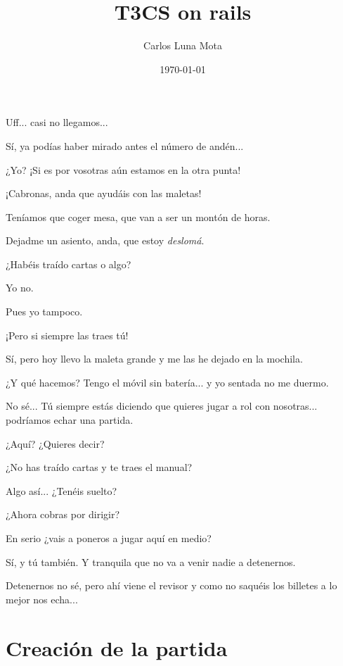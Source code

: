\documentclass[10pt, a5paper, twocolumn]{article}
\title{T3CS on rails}
\author{Carlos Luna Mota}
\date{\today}
\newenvironment{dialogue}
    {\begin{description}[leftmargin=!,align=right,labelwidth=0.cm]}
    {\end{description}}
\newcommand\A{\item[\raisebox{-0.25em}{\scalebox{0.75}{\bctetraedre}}]}
\newcommand\B{\item[\raisebox{-0.25em}{\scalebox{0.75}{\bccube}}]}
\newcommand\E{\item[\raisebox{-0.25em}{\scalebox{0.75}{\bcicosaedre}}]}
\begin{document}
    \maketitle %

    \begin{dialogue}
        \A Uff... casi no llegamos...
        \B Sí, ya podías haber mirado antes el número de andén...
        \A ¿Yo? ¡Si es por vosotras aún estamos en la otra punta!
        \E ¡Cabronas, anda que ayudáis con las maletas!
        \A Teníamos que coger mesa, que van a ser un montón de horas.
        \E Dejadme un asiento, anda, que estoy \emph{deslomá}.
        \A ¿Habéis traído cartas o algo?
        \B Yo no.
        \E Pues yo tampoco.
        \B ¡Pero si siempre las traes tú!
        \E Sí, pero hoy llevo la maleta grande y me las he dejado en la mochila.
        \A ¿Y qué hacemos? Tengo el móvil sin batería... y yo sentada no me duermo.
        \E No sé... Tú siempre estás diciendo que quieres jugar a rol con nosotras... podríamos echar una partida.
        \A ¿Aquí? ¿Quieres decir?
        \B ¿No has traído cartas y te traes el manual?
        \E Algo así... ¿Tenéis suelto?
        \B ¿Ahora cobras por dirigir?
        \A En serio ¿vais a poneros a jugar aquí en medio?
        \E Sí, y tú también. Y tranquila que no va a venir nadie a detenernos.
        \B Detenernos no sé, pero ahí viene el revisor y como no saquéis los billetes a lo mejor nos echa...
    \end{dialogue}

    \section*{Creación de la partida} %
\end{document}

